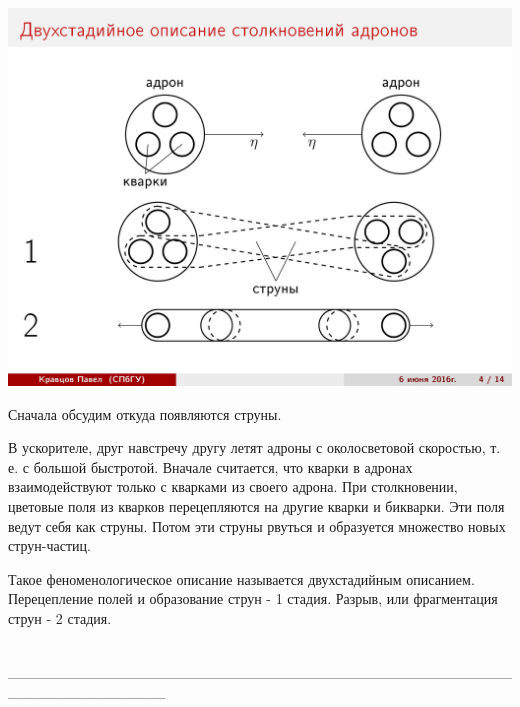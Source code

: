 \documentclass[14pt]{article}
\renewcommand{\line}{\\ \_\_\_\_\_\_\_\_\_\_\_\_\_\_\_\_\_\_\_\_\_\_\_\_\_\_\_\_\_\_\_\_\_\_\_\_\_\_\_\_\_\_\_\_\_\_\_\_\_\_\_\_\_\_\_\_\_\_\_\_\_\_\_ \\ }
\begin{document}
\begin{minipage}[h]{0.5\linewidth}
\includegraphics[width=1\linewidth]{page-04.jpg}
\end{minipage}
\begin{minipage}[h]{0.45\linewidth}
Сначала обсудим откуда появляются струны.

В ускорителе, друг навстречу другу летят адроны с околосветовой скоростью, т. е. с большой быстротой. Вначале считается, что кварки в адронах взаимодействуют только с кварками из своего адрона. При столкновении, цветовые поля из кварков перецепляются на другие кварки и бикварки. Эти поля ведут себя как струны. Потом эти струны рвуться и образуется множество новых струн-частиц.

Такое феноменологическое описание называется двухстадийным описанием. Перецепление полей и образование струн - 1 стадия. Разрыв, или фрагментация струн - 2 стадия.
\end{minipage}
\line
\end{document}
